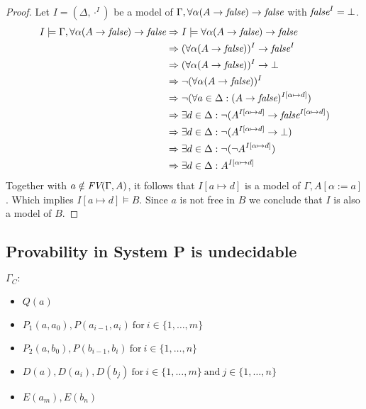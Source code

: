\begin{proof}
Let $I=(\Delta,\cdot^I)$ be a model of $\Gamma,\forall\alpha(A\to\emph{false})\to\emph{false}$ with $\emph{false}^I=\bot$.
\begin{align*}
I\models\Gamma,\forall\alpha(A\to\emph{false})\to\emph{false}&\Rightarrow I\models\forall\alpha(A\to\emph{false})\to\emph{false}\\
&\Rightarrow (\forall\alpha(A\to\emph{false}))^I\to\emph{false}^I\\
&\Rightarrow (\forall\alpha(A\to\emph{false}))^I\to\bot\\
&\Rightarrow \neg(\forall\alpha(A\to\emph{false}))^I\\
&\Rightarrow \neg(\forall a\in\Delta:(A\to\emph{false})^{I\left[\alpha\mapsto d\right]})\\
&\Rightarrow \exists d\in\Delta:\neg(A^{I\left[\alpha\mapsto d\right]}\to\emph{false}^{I\left[\alpha\mapsto d\right]})\\
&\Rightarrow \exists d\in\Delta:\neg(A^{I\left[\alpha\mapsto d\right]}\to\bot)\\
&\Rightarrow \exists d\in\Delta:\neg(\neg A^{I\left[\alpha\mapsto d\right]})\\
&\Rightarrow \exists d\in\Delta:A^{I\left[\alpha\mapsto d\right]}\\
\end{align*}
Together with $a\notin\emph{FV}(\Gamma,A)$, it follows that $I\left[a\mapsto d\right]$ is a model of $\Gamma,A\left[\alpha:=a\right]$. Which implies $I\left[a\mapsto d\right]\models B$.	Since $a$ is not free in $B$ we conclude that $I$ is also a model of $B$.
\end{proof}
\subsection{Provability in System P is undecidable}
$\Gamma_C:$
\begin{itemize}
\item $Q(a)$
\item $P_1(a,a_0),P(a_{i-1},a_i)~\text{for}~i\in\{1,\dots,m\}$
\item $P_2(a,b_0),P(b_{i-1},b_i)~\text{for}~i\in\{1,\dots,n\}$
\item $D(a),D(a_i),D(b_j)~\text{for}~i\in\{1,\dots,m\}~\text{and}~j\in\{1,\dots,n\}$
\item $E(a_m),E(b_n)$
\end{itemize}

